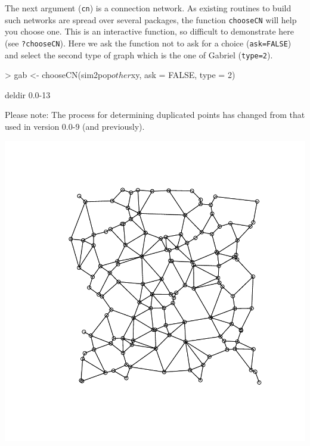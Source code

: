 \documentclass{article}
\begin{document}
\noindent The next argument (\texttt{cn}) is a connection network.
As existing routines to build such networks are spread over several packages, the function \texttt{chooseCN} will help you choose one.
This is an interactive function, so difficult to demonstrate here (see \texttt{?chooseCN}).
Here we ask the function not to ask for a choice (\texttt{ask=FALSE}) and select the second type of graph which is the one of Gabriel (\texttt{type=2}).
\begin{Schunk}
\begin{Sinput}
> gab <- chooseCN(sim2pop$other$xy, ask = FALSE, type = 2)
\end{Sinput}
\begin{Soutput}
deldir 0.0-13 

     Please note: The process for determining duplicated points
     has changed from that used in version 0.0-9 (and previously).
\end{Soutput}
\end{Schunk}
\includegraphics{figs/base-mon4}
\end{document}
